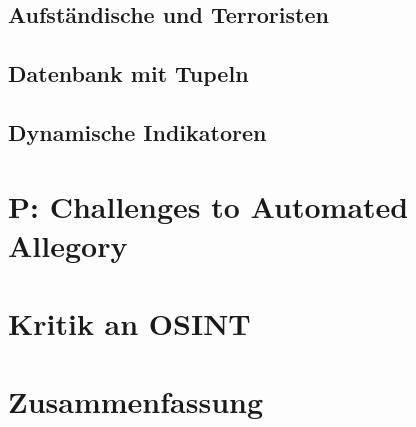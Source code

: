 \documentclass[twoside,a4paper]{article}
\begin{document}
\subsection{Aufständische und Terroristen}


\subsection{Datenbank mit Tupeln}

\subsection{Dynamische Indikatoren}


\section{P: Challenges to Automated Allegory}



\section{Kritik an OSINT}



\section{Zusammenfassung}


\nocite{*}


\end{document}
